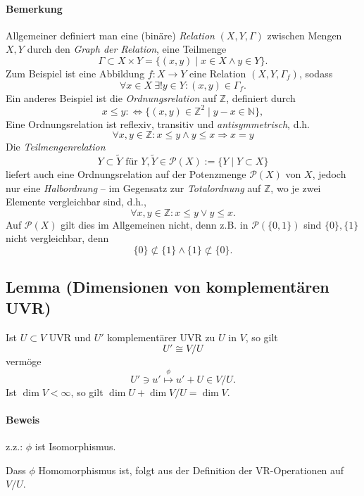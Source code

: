  	\paragraph{Bemerkung}
 		Allgemeiner definiert man eine (binäre) \emph{Relation} $ (X,Y,\Gamma) $ zwischen Mengen $ X, Y $ durch den \emph{Graph der Relation}, eine Teilmenge
 		\[
 			\Gamma \subset X\times Y = \{(x,y)\mid x\in X \land y\in Y\}.
 		\]
 		Zum Beispiel ist eine Abbildung $ f:X\to Y $ eine Relation $ (X,Y,\Gamma_f) $, sodass
 		\[
 			\forall x\in X\ \exists ! y\in Y:(x,y)\in \Gamma_f.
 		\]
 		Ein anderes Beispiel ist die \emph{Ordnungsrelation} auf $ \mathbb{Z} $, definiert durch
 		\[
 			x\leq y :\Leftrightarrow \{(x,y)\in \mathbb{Z}^2\mid y-x\in \mathbb{N}\},
 		\]
 		Eine Ordnungsrelation ist reflexiv, transitiv und \emph{antisymmetrisch}, d.h.
 		\[
 			\forall x,y\in \mathbb{Z}: x\leq y\land y\leq x\Rightarrow x=y
 		\]
 		Die \emph{Teilmengenrelation}
 		\[
 			Y\subset\tilde{Y} \text{ für } Y,\tilde{Y}\in \mathcal{P}(X):= \{Y\mid Y\subset X\}
 		\]
 		liefert auch eine Ordnungsrelation auf der Potenzmenge $ \mathcal{P}(X) $ von $ X $, jedoch nur eine \emph{Halbordnung} -- im Gegensatz zur \emph{Totalordnung} auf $ \mathbb{Z} $, wo je zwei Elemente vergleichbar sind, d.h.,
 		\[
 			\forall x,y\in \mathbb{Z}: x\leq y\lor y\leq x.
 		\]
 		Auf $ \mathcal{P}(X) $ gilt dies im Allgemeinen nicht, denn z.B. in $ \mathcal{P}(\{0,1\}) $ sind $ \{0\},\{1\} $ nicht vergleichbar, denn
 		\[
 			\{0\}\not\subset\{1\}\land \{1\}\not\subset \{0\}.
 		\]

 \subsection{Lemma (Dimensionen von komplementären UVR)}
 	\begin{Lemma}
 		Ist $ U\subset V $ UVR und $ U' $ komplementärer UVR zu $ U $ in $ V $, so gilt
 		\[
 			U'\cong V/U
 		\]
 		vermöge
 		\[
 			U'\ni u' \overset{\phi}{\mapsto} u'+U\in V/U.
 		\]
 		Ist $ \dim V<\infty $, so gilt $ \dim U+\dim V/U = \dim V $.
 	\end{Lemma}

 	\paragraph{Beweis} z.z.: $ \phi $ ist Isomorphismus.

 		Dass $ \phi $ Homomorphismus ist, folgt aus der Definition der VR-Operationen auf $ V/U $.

